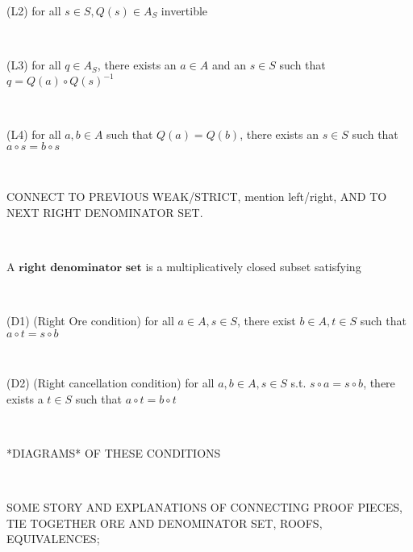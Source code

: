 \documentclass[12pt]{amsart}    %
\theoremstyle{definition}
\begin{document}
(L2) for all $s \in S, Q(s) \in A_S$ invertible

\

(L3) for all $q \in A_S$, there exists an $a \in A$ and an $s \in S$ such that $q = Q(a) \circ Q(s)^{-1}$

\

(L4) for all $a, b \in A$ such that $Q(a) = Q(b)$, there exists an $s \in S$ such that $a \circ s = b \circ s$

\

CONNECT TO PREVIOUS WEAK/STRICT, mention left/right, AND TO NEXT RIGHT DENOMINATOR SET.

\

A $\textbf{right denominator set}$ is a multiplicatively closed subset satisfying

\

(D1) (Right Ore condition) for all $a \in A, s \in S$, there exist  $b \in A, t \in S$ such that $a \circ t = s \circ b$

\

(D2) (Right cancellation condition) for all $a, b \in A, s \in S$ s.t. $s \circ a = s \circ b$, there exists a $t \in S$ such that $a \circ t = b \circ t$

\

*DIAGRAMS* OF THESE CONDITIONS




\

SOME STORY AND EXPLANATIONS OF CONNECTING PROOF PIECES, TIE TOGETHER ORE AND DENOMINATOR SET, ROOFS, EQUIVALENCES; 
\end{document}
